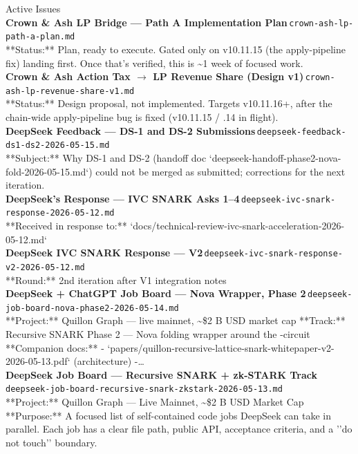 \documentclass[11pt,a4paper]{article}
\begin{document}
Active Issues\\[6pt]
\noindent\textbf{Crown \& Ash LP Bridge --- Path A Implementation Plan}\,\textcolor{qgray}{\small \texttt{crown-ash-lp-path-a-plan.md}}\\
**Status:** Plan, ready to execute. Gated only on v10.11.15 (the apply-pipeline fix) landing first. Once that's verified, this is \textasciitilde{}1 week of focused work.\\[6pt]
\noindent\textbf{Crown \& Ash Action Tax $\rightarrow$ LP Revenue Share (Design v1)}\,\textcolor{qgray}{\small \texttt{crown-ash-lp-revenue-share-v1.md}}\\
**Status:** Design proposal, not implemented. Targets v10.11.16+, after the chain-wide apply-pipeline bug is fixed (v10.11.15 / .14 in flight).\\[6pt]
\noindent\textbf{DeepSeek Feedback --- DS-1 and DS-2 Submissions}\,\textcolor{qgray}{\small \texttt{deepseek-feedback-ds1-ds2-2026-05-15.md}}\\
**Subject:** Why DS-1 and DS-2 (handoff doc `deepseek-handoff-phase2-nova-fold-2026-05-15.md`) could not be merged as submitted; corrections for the next iteration.\\[6pt]
\noindent\textbf{DeepSeek's Response --- IVC SNARK Asks 1--4}\,\textcolor{qgray}{\small \texttt{deepseek-ivc-snark-response-2026-05-12.md}}\\
**Received in response to:** `docs/technical-review-ivc-snark-acceleration-2026-05-12.md`\\[6pt]
\noindent\textbf{DeepSeek IVC SNARK Response --- V2}\,\textcolor{qgray}{\small \texttt{deepseek-ivc-snark-response-v2-2026-05-12.md}}\\
**Round:** 2nd iteration after V1 integration notes\\[6pt]
\noindent\textbf{DeepSeek + ChatGPT Job Board --- Nova Wrapper, Phase 2}\,\textcolor{qgray}{\small \texttt{deepseek-job-board-nova-phase2-2026-05-14.md}}\\
**Project:** Quillon Graph --- live mainnet, \textasciitilde{}\$2 B USD market cap **Track:** Recursive SNARK Phase 2 --- Nova folding wrapper around the \textdelta{}-circuit **Companion docs:** - `papers/quillon-recursive-lattice-snark-whitepaper-v2-2026-05-13.pdf` (architecture) -\ldots{}\\[6pt]
\noindent\textbf{DeepSeek Job Board --- Recursive SNARK + zk-STARK Track}\,\textcolor{qgray}{\small \texttt{deepseek-job-board-recursive-snark-zkstark-2026-05-13.md}}\\
**Project:** Quillon Graph --- Live Mainnet, \textasciitilde{}\$2 B USD Market Cap **Purpose:** A focused list of self-contained code jobs DeepSeek can take in parallel. Each job has a clear file path, public API, acceptance criteria, and a ''do not touch'' boundary.\\[6pt]
\end{document}
